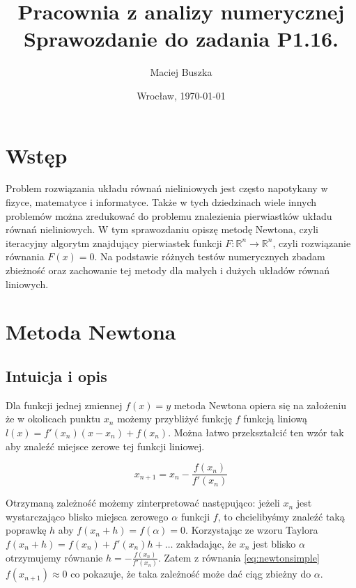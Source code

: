 \documentclass[11pt,wide]{mwart}
\date{Wrocław, \today}
\title{\LARGE\textbf{Pracownia z analizy numerycznej}
  \\Sprawozdanie do zadania \textbf{P1.16.}}
\author{Maciej Buszka}
\begin{document}
 
\maketitle
\thispagestyle{empty}
\tableofcontents

\section{Wstęp}

Problem rozwiązania układu równań nieliniowych jest często napotykany w fizyce, matematyce i informatyce. Także w tych dziedzinach wiele innych problemów można  zredukować do problemu znalezienia pierwiastków układu równań nieliniowych. W tym sprawozdaniu opiszę metodę Newtona, czyli iteracyjny algorytm znajdujący pierwiastek funkcji $ F : \mathbb{R}^n \rightarrow \mathbb{R}^n $, czyli rozwiązanie równania $ F(x) = 0 $. Na podstawie różnych testów numerycznych zbadam zbieżność oraz zachowanie tej metody dla małych i dużych układów równań liniowych.

\section{Metoda Newtona}

\subsection{Intuicja i opis}

Dla funkcji jednej zmiennej $ f(x) = y $ metoda Newtona opiera się na założeniu że w okolicach punktu $ x_n $ możemy przybliżyć funkcję $ f $ funkcją liniową $ l(x) = f'(x_n)(x - x_n) + f(x_n) $. Można łatwo przekształcić ten wzór tak aby znaleźć miejsce zerowe tej funkcji liniowej.

\begin{equation} \label{eq:newtonsimple}
		x_{n+1} = x_n - \frac{f(x_n)}{f'(x_n)}
\end{equation}

Otrzymaną zależność możemy zinterpretować następująco: jeżeli $ x_n $ jest wystarczająco blisko miejsca zerowego $ \alpha $ funkcji $ f $, to chcielibyśmy znaleźć taką poprawkę $ h $ aby $ f(x_n + h) = f(\alpha) = 0 $. Korzystając ze wzoru Taylora $ f(x_n + h) = f(x_n) + f'(x_n)h + \dots $ zakładając, że $ x_n $ jest blisko $ \alpha $ otrzymujemy równanie $ h = -\frac{f(x_n)}{f'(x_n)} $. Zatem z równania \eqref{eq:newtonsimple} $ f(x_{n+1}) \approx 0 $ co pokazuje, że taka zależność może dać ciąg zbieżny do $ \alpha $.\\
 
\end{document}
